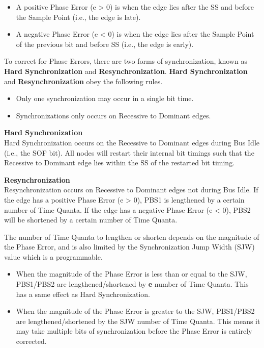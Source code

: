 \documentclass[main\_\_EN.tex]{subfiles}
\begin{document}
\begin{itemize}
    \item A positive Phase Error (e > 0) is when the edge lies after the SS and before the Sample Point (i.e., the edge is late).
    \item A negative Phase Error (e < 0) is when the edge lies after the Sample Point of the previous bit and before SS (i.e., the edge is early).
\end{itemize}

To correct for Phase Errors, there are two forms of synchronization, known as \textbf{Hard Synchronization} and \textbf{Resynchronization}. \textbf{Hard Synchronization} and \textbf{Resynchronization} obey the following rules.

\begin{itemize}
    \item Only one synchronization may occur in a single bit time.
    \item Synchronizations only occurs on Recessive to Dominant edges.
\end{itemize}

{\bfseries Hard Synchronization}\\
Hard Synchronization occurs on the Recessive to Dominant edges during Bus Idle (i.e., the SOF bit). All nodes will restart their internal bit timings such that the Recessive to Dominant edge lies within the SS of the restarted bit timing.

{\bfseries Resynchronization}\\
Resynchronization occurs on Recessive to Dominant edges not during Bus Idle. If the edge has a positive Phase Error (e > 0), PBS1 is lengthened by a certain number of Time Quanta. If the edge has a negative Phase Error (e < 0), PBS2 will be shortened by a certain number of Time Quanta.

The number of Time Quanta to lengthen or shorten depends on the magnitude of the Phase Error, and is also limited by the Synchronization Jump Width (SJW) value which is a programmable.

\begin{itemize}
    \item When the magnitude of the Phase Error is less than or equal to the SJW, PBS1/PBS2 are lengthened/shortened by \textbf{e} number of Time Quanta. This has a same effect as Hard Synchronization.
    \item When the magnitude of the Phase Error is greater to the SJW, PBS1/PBS2 are lengthened/shortened by the SJW number of Time Quanta. This means it may take multiple bits of synchronization before the Phase Error is entirely corrected.
\end{itemize}
\end{document}
